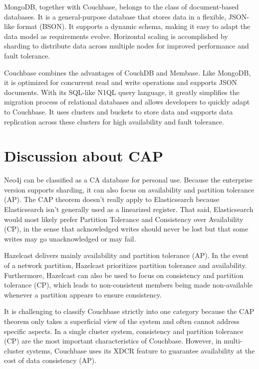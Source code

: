 MongoDB, together with Couchbase, belongs to the class of document-based databases. It is a general-purpose database that stores data in a flexible, JSON-like format (\ac{BSON}). It supports a dynamic schema, making it easy to adapt the data model as requirements evolve. Horizontal scaling is accomplished by sharding to distribute data across multiple nodes for improved performance and fault tolerance.

Couchbase combines the advantages of CouchDB and Membase. Like MongoDB, it is optimized for concurrent read and write operations and supports JSON documents. With its \ac{SQL}-like N1QL query language, it greatly simplifies the migration process of relational databases and allows developers to quickly adapt to Couchbase. It uses clusters and buckets to store data and supports data replication across these clusters for high availability and fault tolerance.

\section{Discussion about CAP}

Neo4j can be classified as a \ac{CA} database for personal use. Because the enterprise version supports sharding, it can also focus on availability and partition tolerance (\ac{AP}).
The CAP theorem doesn’t really apply to Elasticsearch because Elasticsearch isn't generally used as a linearized register. That said, Elasticsearch would most likely prefer Partition Tolerance and Consistency over Availability (\ac{CP}), in the sense that acknowledged writes should never be lost but that some writes may go unacknowledged or may fail.

Hazelcast delivers mainly availability and partition tolerance (\ac{AP}). In the event of a network partition, Hazelcast prioritizes partition tolerance and availability. Furthermore, Hazelcast can also be used to focus on consistency and partition tolerance (\ac{CP}), which leads to non-consistent members being made non-available whenever a partition appears to ensure consistency.

It is challenging to classify Couchbase strictly into one category because the CAP theorem only takes a superficial view of the system and often cannot address specific aspects. In a single cluster system, consistency and partition tolerance (\ac{CP}) are the most important characteristics of Couchbase. However, in multi-cluster systems, Couchbase uses its \ac{XDCR} feature to guarantee availability at the cost of data consistency (\ac{AP}).

